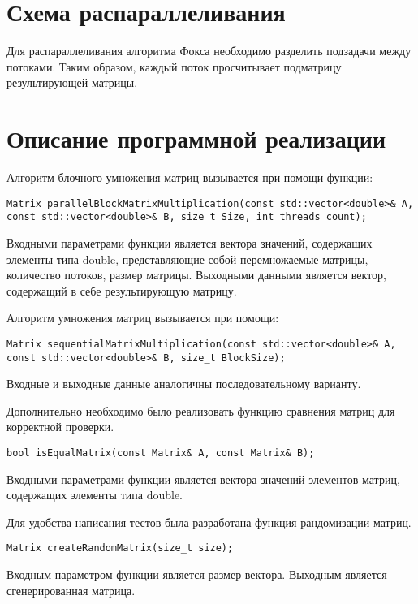 \documentclass{report}
\begin{document}
\section*{Схема распараллеливания}
Для распараллеливания алгоритма Фокса необходимо разделить подзадачи между потоками. Таким образом, каждый поток просчитывает подматрицу результирующей матрицы.
\newpage

\section*{Описание программной реализации}
Алгоритм блочного умножения матриц вызывается при помощи функции:
\begin{lstlisting}
Matrix parallelBlockMatrixMultiplication(const std::vector<double>& A, const std::vector<double>& B, size_t Size, int threads_count);
\end{lstlisting}
\par Входными параметрами функции является вектора значений, содержащих элементы типа double, представляющие собой перемножаемые матрицы, количество потоков, размер матрицы. Выходными данными является вектор, содержащий в себе результирующую матрицу.
\par Алгоритм умножения матриц вызывается при помощи:
\begin{lstlisting}
Matrix sequentialMatrixMultiplication(const std::vector<double>& A, const std::vector<double>& B, size_t BlockSize);
\end{lstlisting}
\par Входные и выходные данные аналогичны последовательному варианту.
\par Дополнительно необходимо было реализовать функцию сравнения матриц для корректной проверки.
\begin{lstlisting}
bool isEqualMatrix(const Matrix& A, const Matrix& B);
\end{lstlisting}
\par Входными параметрами функции является вектора значений элементов матриц, содержащих элементы типа double.
\par Для удобства написания тестов была разработана функция рандомизации матриц.
\begin{lstlisting}
Matrix createRandomMatrix(size_t size);
\end{lstlisting}
\par Входным параметром функции является размер вектора. Выходным является сгенерированная матрица.
\newpage
\end{document}
